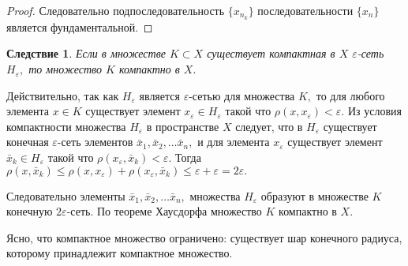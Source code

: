 \documentclass[12pt,a4paper,titlepage,oneside]{book}
\theoremstyle{definition}
\theoremstyle{plain}
\theoremstyle{remark}
\theoremstyle{remark}
\theoremstyle{remark}
\theoremstyle{remark}
\theoremstyle{plain}
\theoremstyle{plain}
\newtheorem*{corollary}{Следствие}
\begin{document}
\begin{proof}
Следовательно подпоследовательность $\{x_{n_k}\}$ последовательности $\{x_n\}$ является фундаментальной.
\end{proof}

\begin{corollary}
Если в множестве $K \subset X$ существует компактная в $X$ $\varepsilon$-сеть $H_{\varepsilon},$ то множество $K$ компактно в $X.$ 
\end{corollary}

Действительно, так как $H_{\varepsilon} $ является $\varepsilon$-сетью для множества $K,$ то для любого элемента $x \in K$ существует элемент $x_{\varepsilon} \in H_{\varepsilon}$ такой что $\rho(x, x_{\varepsilon}) < \varepsilon.$ Из условия компактности множества $H_{\varepsilon}$ в пространстве $X$ следует, что в  $H_{\varepsilon}$ существует конечная $\varepsilon$-сеть элементов $\bar{x}_1, \bar{x}_2,\ldots \bar{x}_n,$ и для элемента $x_{\varepsilon}$ существует элемент $\bar{x}_k \in H_{\varepsilon}$ такой что $\rho(x_{\varepsilon}, \bar{x}_k) < \varepsilon.$ Тогда $\rho(x, \bar{x}_k) \leqslant \rho(x, x_{\varepsilon}) + \rho(x_{\varepsilon}, \bar{x}_k) \leqslant \varepsilon + \varepsilon = 2 \varepsilon.$

Следовательно элементы $\bar{x}_1, \bar{x}_2,\ldots \bar{x}_n,$ множества $H_{\varepsilon}$ образуют в множестве $K$ конечную $2 \varepsilon$-сеть. По теореме Хаусдорфа множество $K$ компактно в $X.$

Ясно, что компактное множество ограничено: существует шар конечного радиуса, которому принадлежит компактное множество.
\end{document}
